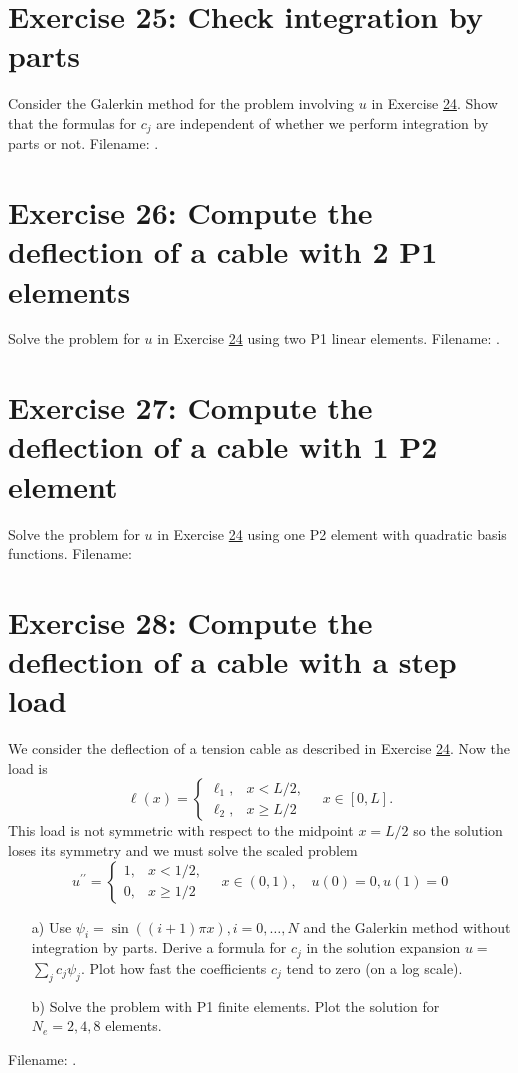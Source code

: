\documentclass[../main.tex]{subfiles}
\begin{document}
	\section*{Exercise 25: Check integration by parts}
		Consider the Galerkin method for the problem involving $u$ in Exercise \hyperref[sec:sec_21_24]{24}. Show that the formulas for $c_{j}$ are independent of whether we perform integration by parts or not. Filename: .\bigbreak
	\section*{Exercise 26: Compute the deflection of a cable with 2 P1 elements}
		Solve the problem for $u$ in Exercise \hyperref[sec:sec_21_24]{24} using two P1 linear elements. Filename: .\bigbreak
	\section*{Exercise 27: Compute the deflection of a cable with 1 P2 element}
		Solve the problem for $u$ in Exercise \hyperref[sec:sec_21_24]{24} using one P2 element with quadratic basis functions. Filename:  \bigbreak
	\section*{Exercise 28: Compute the deflection of a cable with a step load}
		\noindent We consider the deflection of a tension cable as described in Exercise \hyperref[sec:sec_21_24]{24}. Now the load is
		$$
		\ell(x)=\left\{\begin{array}{ll}
			\ell_{1}, & x<L / 2, \\
			\ell_{2}, & x \geq L / 2
		\end{array} \quad x \in[0, L] .\right.
		$$
		This load is not symmetric with respect to the midpoint $x=L / 2$ so the solution loses its symmetry and we must solve the scaled problem
		$$
		u^{\prime \prime}=\left\{\begin{array}{ll}
			1, & x<1 / 2, \\
			0, & x \geq 1 / 2
		\end{array} \quad x \in(0,1), \quad u(0)=0, u(1)=0\right.
		$$
		\begin{enumerate}
			\item[a)] Use $\psi_{i}=\sin ((i+1) \pi x), i=0, \ldots, N$ and the Galerkin method without integration by parts. Derive a formula for $c_{j}$ in the solution expansion $u=$ $\sum_{j} c_{j} \psi_{j}$. Plot how fast the coefficients $c_{j}$ tend to zero (on a log scale).
			\item[b)]Solve the problem with P1 finite elements. Plot the solution for $N_{e}=2,4,8$ elements.
		\end{enumerate}
		Filename: .\bigbreak
\end{document}
